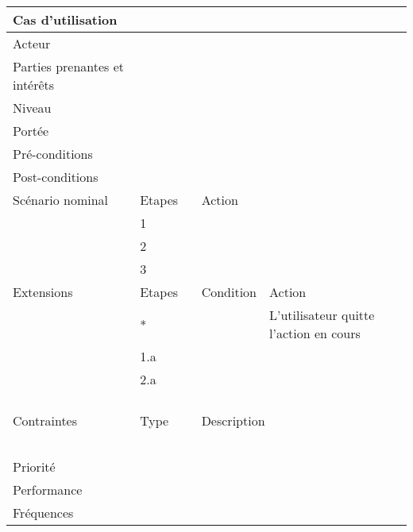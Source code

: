\noindent 

\begin{tabular}{|p{1.3in}|p{0.3in}|p{0.5in}|p{1.6in}|} \hline 
Cas d'utilisation & \multicolumn{3}{|p{2.4in}|}{} \\ \hline 
Acteur & \multicolumn{3}{|p{2.4in}|}{} \\ \hline 
Parties prenantes et intérêts & \multicolumn{3}{|p{2.4in}|}{} \\ \hline 
Niveau & \multicolumn{3}{|p{2.4in}|}{} \\ \hline 
Portée & \multicolumn{3}{|p{2.4in}|}{~} \\ \hline 
Pré-conditions & \multicolumn{3}{|p{2.4in}|}{} \\ \hline 
Post-conditions & \multicolumn{3}{|p{2.4in}|}{} \\ \hline 
Scénario nominal & Etapes & Action &  \\ \hline 
 & 1 & \multicolumn{2}{|p{2.1in}|}{} \\ \hline 
 & 2 & \multicolumn{2}{|p{2.1in}|}{} \\ \hline 
 & 3\newline  & \multicolumn{2}{|p{2.1in}|}{} \\ \hline 
Extensions & Etapes & Condition & Action \\ \hline 
 & * &  & L'utilisateur quitte l'action en cours \\ \hline 
 & 1.a &  &  \\ \hline 
 & 2.a ~~ ~~ ~ &  &  \\ \hline 
Contraintes & Type & \multicolumn{2}{|p{2.1in}|}{Description} \\ \hline 
 & ~ & \multicolumn{2}{|p{2.1in}|}{~} \\ \hline 
Priorité & \multicolumn{3}{|p{2.4in}|}{} \\ \hline 
Performance & \multicolumn{3}{|p{2.4in}|}{~} \\ \hline 
Fréquences & \multicolumn{3}{|p{2.4in}|}{} \\ \hline 
\end{tabular}

~

\noindent 

\noindent 
